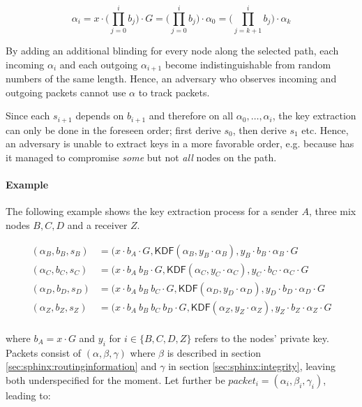 $$ \alpha_i = x \cdot \biggl(\prod_{j=0}^{i} b_j \biggr) \cdot G = \biggl(\prod_{j=0}^{i} b_j \biggr) \cdot \alpha_0 = \biggl(\prod_{j=k+1}^{i} b_j \biggr) \cdot \alpha_k $$

By adding an additional blinding for every node along the selected path, each incoming $\alpha_i$ and each outgoing $\alpha_{i+1}$ become indistinguishable from random numbers of the same length. Hence, an adversary who observes incoming and outgoing packets cannot use $\alpha$ to track packets.

Since each $s_{i+1}$ depends on $b_{i+1}$ and therefore on all $\alpha_0, \dots , \alpha_i$, the key extraction can only be done in the foreseen order; first derive $s_0$, then derive $s_1$ etc. Hence, an adversary is unable to extract keys in a more favorable order, e.g. because has it managed to compromise \textit{some} but not \textit{all} nodes on the path.

\paragraph{Example}

The following example shows the key extraction process for a sender $A$, three mix nodes $B,C,D$ and a receiver $Z$.

\begin{align*}
    (\alpha_B,b_B,s_B) & = (x \cdot b_A \cdot G,\textsf{KDF}(\alpha_B,y_B \cdot \alpha_B), y_B \cdot b_B \cdot \alpha_B \cdot G                   \\
    (\alpha_C,b_C,s_C) & = (x \cdot b_A \ b_B \cdot G,\textsf{KDF}(\alpha_C,y_C \cdot \alpha_C), y_C \cdot b_C \cdot \alpha_C \cdot G             \\
    (\alpha_D,b_D,s_D) & = (x \cdot b_A \ b_B \ b_C \cdot G,\textsf{KDF}(\alpha_D,y_D \cdot \alpha_D), y_D \cdot b_D \cdot \alpha_D \cdot G       \\
    (\alpha_Z,b_Z,s_Z) & = (x \cdot b_A \ b_B \ b_C \ b_D \cdot G,\textsf{KDF}(\alpha_Z,y_Z \cdot \alpha_Z), y_Z \cdot b_Z \cdot \alpha_Z \cdot G \\
\end{align*}

where $b_A = x \cdot G$ and $y_i$ for $i \in \{ B,C,D,Z \}$ refers to the nodes' private key. Packets consist of $(\alpha, \beta, \gamma)$ where $\beta$ is described in section \ref{sec:sphinx:routinginformation} and $\gamma$ in section \ref{sec:sphinx:integrity}, leaving both underspecified for the moment. Let further be $packet_i = (\alpha_i, \beta_i, \gamma_i)$, leading to:

